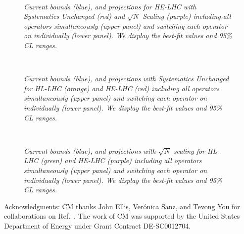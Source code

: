 \documentclass[../report.tex]{subfiles}
\providecommand{\main}{..}
\begin{document}
\begin{figure}
  \centering
    \\
 \caption{\it Current bounds (blue), and projections for HE-LHC with Systematics Unchanged (red) and $\sqrt{N}$ Scaling (purple) including all operators simultaneously (upper panel) and switching each operator on individually (lower panel). We display the best-fit values and 95\% CL ranges.}
   \label{fig8:comp34}
\end{figure} 

\begin{figure}
  \centering
    \\
 \caption{\it Current bounds (blue), and projections with Systematics Unchanged for HL-LHC (orange) and HE-LHC (red) including all operators simultaneously (upper panel) and switching each operator on individually (lower panel). We display the best-fit values and 95\% CL ranges.}
   \label{fig8:comp56}
\end{figure} 

\begin{figure}
  \centering
    \\
 \caption{\it Current bounds (blue), and projections with $\sqrt{N}$ scaling for HL-LHC (green) and HE-LHC (purple) including all operators simultaneously (upper panel) and switching each operator on individually (lower panel). We display the best-fit values and 95\% CL ranges.}
   \label{fig8:comp78}
\end{figure}

Acknowledgments: 
CM thanks John Ellis, Ver\'{o}nica Sanz, and Tevong You for collaborations on Ref.~\cite{Ellis:2018gqa}.
The work of CM was supported by the United States Department of Energy under Grant Contract DE-SC0012704.
\end{document}
